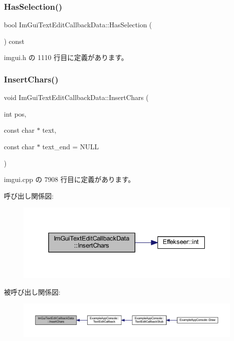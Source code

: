 \subsubsection{\texorpdfstring{Has\+Selection()}{HasSelection()}}
{\footnotesize\ttfamily bool Im\+Gui\+Text\+Edit\+Callback\+Data\+::\+Has\+Selection (\begin{DoxyParamCaption}{ }\end{DoxyParamCaption}) const\hspace{0.3cm}{\ttfamily [inline]}}



 imgui.\+h の 1110 行目に定義があります。

\mbox{\label{struct_im_gui_text_edit_callback_data_a78aa927e57bf5fb898ba5a168e9bcf63}} 
\subsubsection{\texorpdfstring{Insert\+Chars()}{InsertChars()}}
{\footnotesize\ttfamily void Im\+Gui\+Text\+Edit\+Callback\+Data\+::\+Insert\+Chars (\begin{DoxyParamCaption}\item[{int}]{pos,  }\item[{const char $\ast$}]{text,  }\item[{const char $\ast$}]{text\+\_\+end = {\ttfamily NULL} }\end{DoxyParamCaption})}



 imgui.\+cpp の 7908 行目に定義があります。

呼び出し関係図\+:\nopagebreak
\begin{figure}[H]
\begin{center}
\leavevmode
\includegraphics[width=326pt]{struct_im_gui_text_edit_callback_data_a78aa927e57bf5fb898ba5a168e9bcf63_cgraph}
\end{center}
\end{figure}
被呼び出し関係図\+:\nopagebreak
\begin{figure}[H]
\begin{center}
\leavevmode
\includegraphics[width=350pt]{struct_im_gui_text_edit_callback_data_a78aa927e57bf5fb898ba5a168e9bcf63_icgraph}
\end{center}
\end{figure}


